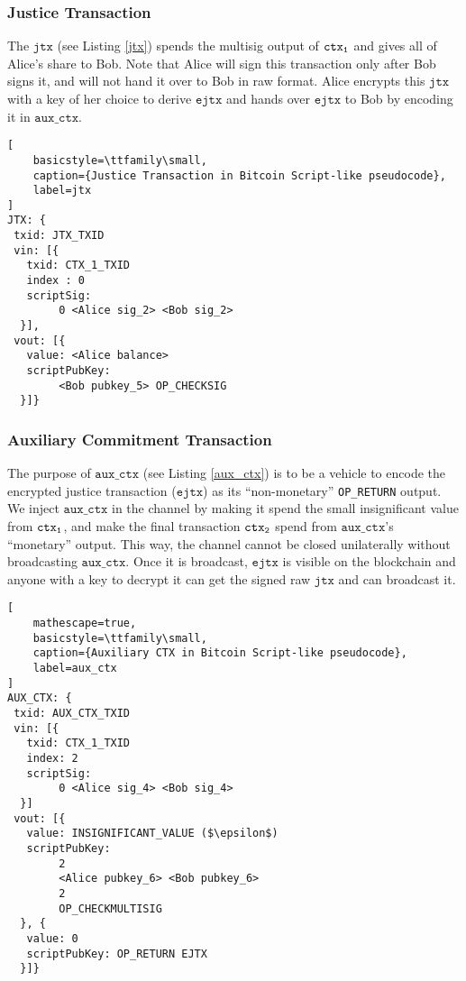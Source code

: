 \subsubsection{Justice Transaction}
The $\texttt{jtx}$ (see Listing \ref{jtx}) spends the multisig output of $\texttt{ctx\textsubscript{1}}$ and gives all of Alice's share to Bob. Note that Alice will sign this transaction only after Bob signs it, and will not hand it over to Bob in raw format. Alice encrypts this $\texttt{jtx}$ with a key of her choice to derive $\texttt{ejtx}$ and hands over $\texttt{ejtx}$ to Bob by encoding it in $\texttt{aux\_ctx}$. 

\begin{lstlisting}[
    basicstyle=\ttfamily\small,
    caption={Justice Transaction in Bitcoin Script-like pseudocode},
    label=jtx
]
JTX: {
 txid: JTX_TXID
 vin: [{
   txid: CTX_1_TXID
   index : 0
   scriptSig: 
        0 <Alice sig_2> <Bob sig_2>
  }],
 vout: [{
   value: <Alice balance>
   scriptPubKey: 
        <Bob pubkey_5> OP_CHECKSIG
  }]}
\end{lstlisting}

\subsubsection{Auxiliary Commitment Transaction}
The purpose of $\texttt{aux\_ctx}$ (see Listing \ref{aux_ctx}) is to be a vehicle to encode the encrypted justice transaction ($\texttt{ejtx}$) as its ``non-monetary'' \texttt{OP\_RETURN} output. We inject $\texttt{aux\_ctx}$ in the channel by making it spend the small insignificant value from $\texttt{ctx\textsubscript{1}}$, and make the final transaction $\texttt{ctx\textsubscript{2}}$ spend from $\texttt{aux\_ctx}$'s ``monetary'' output. This way, the channel cannot be closed unilaterally without broadcasting $\texttt{aux\_ctx}$. Once it is broadcast, $\texttt{ejtx}$ is visible on the blockchain and anyone with a key to decrypt it can get the signed raw $\texttt{jtx}$ and can broadcast it.

\begin{lstlisting}[
    mathescape=true,
    basicstyle=\ttfamily\small,
    caption={Auxiliary CTX in Bitcoin Script-like pseudocode},
    label=aux_ctx
]
AUX_CTX: {
 txid: AUX_CTX_TXID
 vin: [{
   txid: CTX_1_TXID
   index: 2
   scriptSig: 
        0 <Alice sig_4> <Bob sig_4>
  }]
 vout: [{
   value: INSIGNIFICANT_VALUE ($\epsilon$)
   scriptPubKey: 
        2 
        <Alice pubkey_6> <Bob pubkey_6> 
        2 
        OP_CHECKMULTISIG
  }, {
   value: 0
   scriptPubKey: OP_RETURN EJTX
  }]}
\end{lstlisting}

